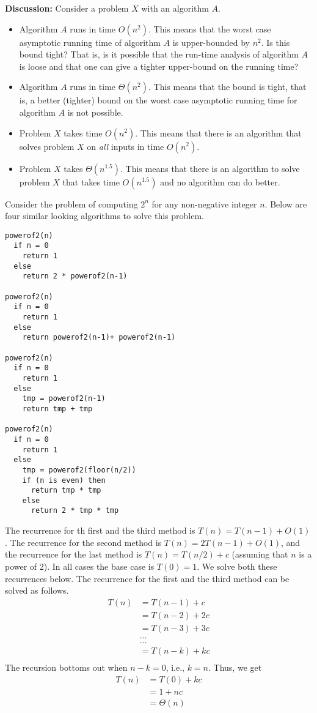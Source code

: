 \documentclass[11pt,twoside]{article}
\def\ni{\noindent}
\begin{document}
\ni
\textbf{Discussion:} Consider a problem $X$ with an algorithm $A$.
\begin{itemize}
\item
Algorithm $A$ runs in time $O(n^2)$. This means that the worst case
asymptotic running time of algorithm $A$ is upper-bounded by $n^2$.
Is this bound tight? That is,
is it possible that the run-time analysis of algorithm $A$ is
loose and that one can give a tighter upper-bound on the running time?  
\item
Algorithm $A$ runs in time $\Theta(n^2)$. This means that the bound
is tight, that is, a better (tighter) bound on the worst case
asymptotic running time for algorithm $A$ is not possible. 
\item
Problem $X$ takes time $O(n^2)$. This means that there is
an algorithm that solves problem $X$ on \textit{all} inputs in time
$O(n^2)$. 
\item
Problem $X$ takes $\Theta(n^{1.5})$. This means that there is
an algorithm to solve problem $X$ that takes time $O(n^{1.5})$ and
no algorithm can do better.
\end{itemize}

Consider the problem of
computing $2^n$ for any non-negative integer $n$. 
Below are four similar looking algorithms to
solve this problem. 

\begin{verbatim}
powerof2(n)
  if n = 0 
    return 1
  else
    return 2 * powerof2(n-1)

powerof2(n)
  if n = 0 
    return 1
  else
    return powerof2(n-1)+ powerof2(n-1)

powerof2(n)
  if n = 0 
    return 1
  else
    tmp = powerof2(n-1)
    return tmp + tmp

powerof2(n)
  if n = 0 
    return 1
  else
    tmp = powerof2(floor(n/2))
    if (n is even) then
      return tmp * tmp
    else
      return 2 * tmp * tmp 
\end{verbatim}

The recurrence for th first and the third method is 
$T(n) = T(n-1) + O(1)$. The recurrence for the second method is 
$T(n) = 2T(n-1)+O(1)$, and the recurrence for the last method is
$T(n)=T(n/2)+c$ (assuming that $n$ is a power of 2). 
In all cases the base case is $T(0) = 1$.  We
solve both these recurrences below. The recurrence for the first and
the third method can be solved as follows.\\

\begin{align*}
T(n) & =  T(n-1) + c \\
& =  T(n-2) + 2c \\
& =  T(n-3) + 3c\\
&  \ldots \\
&  \ldots \\
& =  T(n-k) + kc \\
\end{align*}
\noindent
The recursion bottoms out when $n-k=0$, i.e., $k=n$. Thus, we get
\begin{align*}
T(n) & =  T(0) + kc\\
     & =  1 + nc \\
     & =  \Theta(n)
\end{align*}
\end{document}
